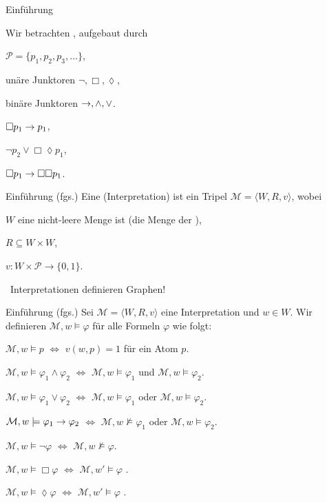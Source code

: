 \usetikzlibrary{arrows}

\begin{frame}{Einf\"uhrung}
\bi
\item Wir betrachten , aufgebaut durch 
\bi
	\item {} $\mathcal{P} = \{p_1,p_2,p_3,\ldots\}$,
	\item un\"are Junktoren $\neg, \Box, \lozenge$,
	\item bin\"are Junktoren $\rightarrow, \wedge, \vee$.
\ei
\ms
\item {} 
\bi
 \item $\Box p_1 \rightarrow p_1$, 
 \item $\neg p_2 \vee \Box\lozenge p_1$,
 \item $\Box p_1 \rightarrow \Box \Box p_1$.
\ei
\ei
\end{frame}

\begin{frame}{Einf\"uhrung (fgs.)}
Eine  (Interpretation) ist ein Tripel $\mathcal{M} = \langle W, R, v\rangle$, wobei\pause
\bi
	\item $W$ eine nicht-leere Menge ist (die Menge der ),\pause
	\item $R \subseteq W \times W$,\pause
	\item $v : W \times \mathcal{P} \rightarrow \{0,1\}$.
\ei

\bs
\pause

\ithand\ Interpretationen definieren Graphen!
\end{frame}

\begin{frame}{Einf\"uhrung (fgs.)}
Sei $\mathcal{M} = \langle W, R, v\rangle$ eine Interpretation und $w \in W$. Wir definieren $\mathcal{M}, w \models \varphi$ f\"ur alle Formeln $\varphi$ wie folgt:
\bi
	\item $\mathcal{M}, w \models p$ $\iff$ $v(w,p) = 1$ f\"ur ein Atom $p$.
	\item $\mathcal{M}, w \models \varphi_1 \wedge \varphi_2$ $\iff$ $\mathcal{M}, w \models \varphi_1$ und $\mathcal{M}, w \models \varphi_2$.
	\item $\mathcal{M}, w \models \varphi_1 \vee \varphi_2$ $\iff$ $\mathcal{M}, w \models \varphi_1$ oder $\mathcal{M}, w \models \varphi_2$.
	\item $\mathcal{M}, w \models \varphi_1 \rightarrow \varphi_2$ $\iff$ $\mathcal{M}, w \not\models \varphi_1$ oder $\mathcal{M}, w \models \varphi_2$.
	\item $\mathcal{M}, w \models \neg\varphi$ $\iff$ $\mathcal{M}, w \not\models \varphi$.\pause
	\item $\mathcal{M}, w \models \Box\varphi$ $\iff$ $\mathcal{M}, w' \models \varphi$ .
	\item $\mathcal{M}, w \models \lozenge\varphi$ $\iff$ $\mathcal{M}, w' \models \varphi$ .
	
\ei
\end{frame}

